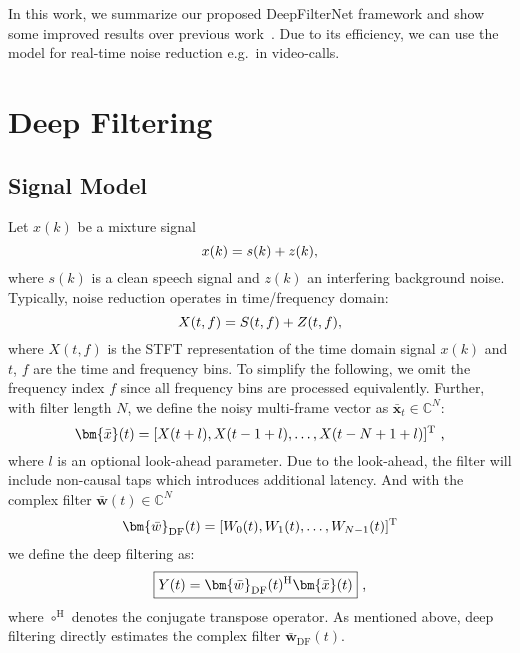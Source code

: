 \documentclass{INTERSPEECH2023}
\newcommand{\C}{\mathbb{C}}
\begin{document}
In this work, we summarize our proposed DeepFilterNet framework and show some improved results over previous work~\cite{schroeter2022deepfilternet2}.
Due to its efficiency, we can use the model for real-time noise reduction e.g.~in video-calls.

\section{Deep Filtering}
\vspace{-.2em}
\label{sec:df}
\subsection{Signal Model}
\vspace{-.2em}
\label{ssec:signalmodel}
Let $x(k)$ be a mixture signal
\vspace{-.25em}\begin{equation}
  x(k) = s(k) + z(k)\text{,}
  \label{eq:sigmodel}
  \vspace{-.2em}
\end{equation}
where $s(k)$ is a clean speech signal and $z(k)$ an interfering background noise.
Typically, noise reduction operates in time/frequency domain:
\begin{equation}
  X(t, f) = S(t, f) + Z(t, f)\text{,}
  \vspace{-.2em}
\end{equation}
where $X(t, f)$ is the STFT representation of the time domain signal $x(k)$ and $t$, $f$ are the time and frequency bins.
To simplify the following, we omit the frequency index $f$ since all frequency bins are processed equivalently.
Further, with filter length $N$, we define the noisy multi-frame vector as $\bm{\bar{x}}_{t} \in \C^N$:
\begin{equation}
  \bm{\bar{x}}(t)= [X(t + l), X(t - 1 + l), \dots, X(t -N+1 +l)]^\text{T}\text{\ ,}
  \vspace{-.2em}
\end{equation}
where $l$ is an optional look-ahead parameter.
Due to the look-ahead, the filter will include non-causal taps which introduces additional latency.
And with the complex filter $\bm{\bar{w}}(t) \in \C^N$
\begin{equation}
  \bm{\bar{w}}_\text{DF}(t)= [W_0(t), W_1(t), \dots, W_{N-1}(t)]^\text{T}
  \vspace{-.2em}
\end{equation}
we define the deep filtering as:
\begin{equation}
  \boxed{Y(t) = \bm{\bar{w}}_{\text{DF}}(t)^{\text{H}}\bm{\bar{x}}(t)}\text{\ ,}
  \label{eq:df2}
  \vspace{-.2em}
\end{equation}
where $\circ^\text{H}$ denotes the conjugate transpose operator.
As mentioned above, deep filtering directly estimates the complex filter $\bm{\bar w}_\text{DF}(t)$.
\vspace{-.4em}
\end{document}
